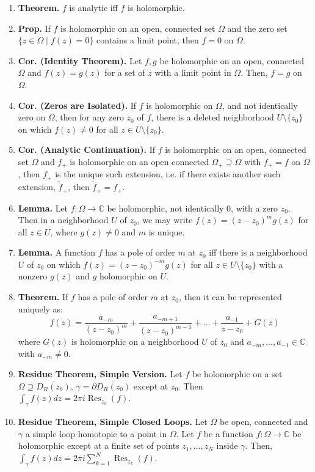 \documentclass[11pt]{article}
\theoremstyle{definition}
\theoremstyle{named}
\DeclareMathOperator{\Res}{Res}
\begin{document}
\begin{enumerate}
    \item \textbf{Theorem. } $f$ is analytic iff $f$ is holomorphic. 
    \item \textbf{Prop. } If $f$ is holomorphic on an open, connected set $\Omega$ and the zero set $\{z \in \Omega \mid f(z) = 0\}$ contains a limit point, then $f=0$ on $\Omega$. 
    \item \textbf{Cor. (Identity Theorem). } Let $f,g$ be holomorphic on an open, connected $\Omega$ and $f(z)=g(z)$ for a set of $z$ with a limit point in $\Omega$. Then, $f=g$ on $\Omega$. 
    \item \textbf{Cor. (Zeros are Isolated). } If $f$ is holomorphic on $\Omega$, and not identically zero on $\Omega$, then for any zero $z_0$ of $f$, there is a deleted neighborhood $U \setminus \{z_0\}$ on which $f(z) \neq 0$ for all $z \in U \setminus \{z_0\}$. 
    \item \textbf{Cor. (Analytic Continuation). } If $f$ is holomorphic on an open, connected set $\Omega$ and $f_+$ is holomorphic on an open connected $\Omega_+ \supseteq \Omega$ with $f_+ = f$ on $\Omega$, then $f_+$ is the unique such extension, i.e. if there exists another such extension, $\tilde{f}_+$, then $\tilde{f}_+ = f_+$. 
    \item \textbf{Lemma. } Let $f: \Omega \to \mathbb{C}$ be holomorphic, not identically 0, with a zero $z_0$. Then in a neighborhood $U$ of $z_0$, we may write $f(z) = (z-z_0)^mg(z)$ for all $z \in U$, where $g(z) \neq 0$ and $m$ is unique. 
    \item \textbf{Lemma. } A function $f$ has a pole of order $m$ at $z_0$ iff there is a neighborhood $U$ of $z_0$ on which $f(z) = (z-z_0)^{-m}g(z)$ for all $z \in U \setminus \{z_0\}$ with a nonzero $g(z)$ and $g$ holomorphic on $U$. 
    \item \textbf{Theorem. } If $f$ has a pole of order $m$ at $z_0$, then it can be represented uniquely as: 
    $$
    f(z) = \frac{a_{-m}}{(z-z_0)^m} + \frac{a_{-m+1}}{(z-z_0)^{m-1}} + \dots + \frac{a_{-1}}{z-z_0} + G(z)
    $$ where $G(z)$ is holomorphic on a neighborhood $U$ of $z_0$ and $a_{-m}, \dots, a_{-1} \in \mathbb{C}$ with $a_{-m} \neq 0$. 
    \item \textbf{Residue Theorem, Simple Version. } Let $f$ be holomorphic on a set $\Omega \supseteq \overline{D_R(z_0)}$, $\gamma = \partial \overline{D_R(z_0)}$ except at $z_0$. Then $\int_\gamma f(z) dz = 2\pi i \Res_{z_0}(f)$. 
    \item \textbf{Residue Theorem, Simple Closed Loops. } Let $\Omega$ be open, connected and $\gamma$ a simple loop homotopic to a point in $\Omega$. Let $f$ be a function $f: \Omega \to \mathbb{C}$ be holomorphic except at a finite set of points $z_1, \dots, z_N$ inside $\gamma$. Then, $\int_\gamma f(z) dz = 2\pi i \sum_{k=1}^{N}\Res_{z_k}(f)$. 

\end{enumerate}
\end{document}
